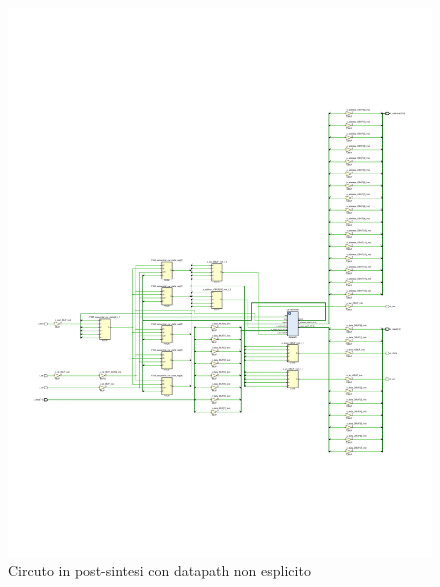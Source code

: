 \documentclass[12pt]{article} %
\begin{document}
			\begin{figure}[H]
				\centering
				\includegraphics[width=1.1\textwidth]{PostSynthesis_Closed_Schematic.pdf}
				\caption{Circuto in post-sintesi con datapath non esplicito}
				\label{fig:Schematic_PostSynthesis_Closed}
			\end{figure}
\end{document}
